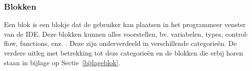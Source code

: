 \documentclass[]{article}
\begin{document}
\subsubsection{Blokken}
\label{primitive}
Een blok is een blokje dat de gebruiker kan plaatsen in het programmeer venster van de IDE. Deze blokken kunnen alles voorstellen, bv. variabelen, types, control-flow, functions, enz. . Deze zijn onderverdeeld in verschillende categorie\"en. De verdere uitleg met betrekking tot deze categorie\"en en de blokken die erbij horen staan in bijlage op Sectie~\ref{bijlageblok}.
 
 
\end{document}
